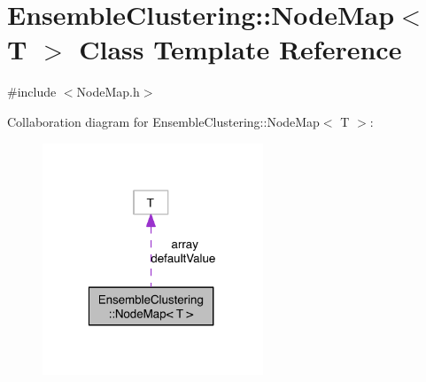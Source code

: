 \hypertarget{class_ensemble_clustering_1_1_node_map}{\section{Ensemble\-Clustering\-:\-:Node\-Map$<$ T $>$ Class Template Reference}
\label{class_ensemble_clustering_1_1_node_map}
}


{\ttfamily \#include $<$Node\-Map.\-h$>$}



Collaboration diagram for Ensemble\-Clustering\-:\-:Node\-Map$<$ T $>$\-:\nopagebreak
\begin{figure}[H]
\begin{center}
\leavevmode
\includegraphics[width=187pt]{class_ensemble_clustering_1_1_node_map__coll__graph}
\end{center}
\end{figure}
